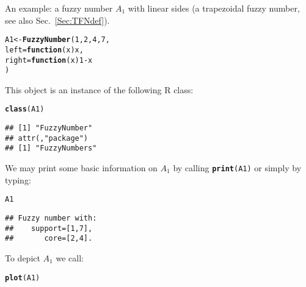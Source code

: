 \documentclass[11pt]{article}\usepackage[]{graphicx}\usepackage[]{color}
\makeatletter
\newcommand{\hlnum}[1]{\textcolor[rgb]{0.686,0.059,0.569}{#1}}%
\newcommand{\hlopt}[1]{\textcolor[rgb]{0,0,0}{#1}}%
\newcommand{\hlstd}[1]{\textcolor[rgb]{0.345,0.345,0.345}{#1}}%
\newcommand{\hlkwa}[1]{\textcolor[rgb]{0.161,0.373,0.58}{\textbf{#1}}}%
\newcommand{\hlkwb}[1]{\textcolor[rgb]{0.69,0.353,0.396}{#1}}%
\newcommand{\hlkwc}[1]{\textcolor[rgb]{0.333,0.667,0.333}{#1}}%
\newcommand{\hlkwd}[1]{\textcolor[rgb]{0.737,0.353,0.396}{\textbf{#1}}}%
\newenvironment{kframe}{%
 \def\at@end@of@kframe{}%
 \ifinner\ifhmode%
  \def\at@end@of@kframe{\end{minipage}}%
  \begin{minipage}{\columnwidth}%
 \fi\fi%
 \def\FrameCommand##1{\hskip\@totalleftmargin \hskip-\fboxsep
 \colorbox{shadecolor}{##1}\hskip-\fboxsep
     \hskip-\linewidth \hskip-\@totalleftmargin \hskip\columnwidth}%
 \MakeFramed {\advance\hsize-\width
   \@totalleftmargin\z@ \linewidth\hsize
   \@setminipage}}%
 {\par\unskip\endMakeFramed%
 \at@end@of@kframe}
\newenvironment{knitrout}{}{} %
\newcommand{\lang}[1]{\textsf{#1}\xspace}
\newcommand{\R}{\lang{R}}
\newcommand{\func}[1]{\texttt{\hlkwd{#1}}}
\makeatother
\begin{document}
\bigskip
An example: a fuzzy number $A_1$ with linear sides
(a trapezoidal fuzzy number, see also Sec.~\ref{Sec:TFNdef}).

\begin{knitrout}\small
{}\color{fgcolor}\begin{kframe}
\begin{alltt}
\hlstd{A1} \hlkwb{<-} \hlkwd{FuzzyNumber}\hlstd{(}\hlnum{1}\hlstd{,} \hlnum{2}\hlstd{,} \hlnum{4}\hlstd{,} \hlnum{7}\hlstd{,}
    \hlkwc{left}\hlstd{=}\hlkwa{function}\hlstd{(}\hlkwc{x}\hlstd{) x,}
   \hlkwc{right}\hlstd{=}\hlkwa{function}\hlstd{(}\hlkwc{x}\hlstd{)} \hlnum{1}\hlopt{-}\hlstd{x}
\hlstd{)}
\end{alltt}
\end{kframe}
\end{knitrout}

\noindent
This object is an instance of the following \R class:

\begin{knitrout}\small
{}\color{fgcolor}\begin{kframe}
\begin{alltt}
\hlkwd{class}\hlstd{(A1)}
\end{alltt}
\begin{verbatim}
## [1] "FuzzyNumber"
## attr(,"package")
## [1] "FuzzyNumbers"
\end{verbatim}
\end{kframe}
\end{knitrout}

\noindent
We may print some basic information on $A_1$ by calling \texttt{\func{print}(A1)} or
simply by typing:

\begin{knitrout}\small
{}\color{fgcolor}\begin{kframe}
\begin{alltt}
\hlstd{A1}
\end{alltt}
\begin{verbatim}
## Fuzzy number with:
##    support=[1,7],
##       core=[2,4].
\end{verbatim}
\end{kframe}
\end{knitrout}

\noindent
To depict $A_1$ we call:

\begin{knitrout}\small
{}\color{fgcolor}\begin{kframe}
\begin{alltt}
\hlkwd{plot}\hlstd{(A1)}
\end{alltt}
\end{kframe}
\end{knitrout}
\end{document}
